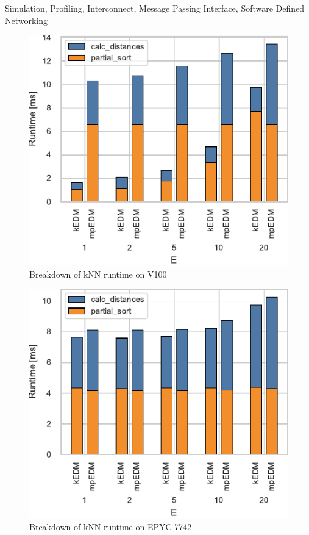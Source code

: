 \documentclass[conference]{IEEEtran}
\begin{document}
\begin{IEEEkeywords}
    Simulation, Profiling, Interconnect, Message Passing Interface, Software
    Defined Networking
\end{IEEEkeywords}

\begin{figure}
    \centering
    \includegraphics{figs/breakdown_v100}
    \caption{Breakdown of kNN runtime on V100}%
    \label{fig:architecture}
\end{figure}

\begin{figure}
    \centering
    \includegraphics{figs/breakdown_epyc}
    \caption{Breakdown of kNN runtime on EPYC 7742}%
    \label{fig:architecture}
\end{figure}
\end{document}
